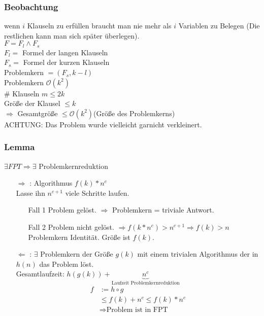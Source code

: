 \begin{enumerate}
\subsubsection*{Beobachtung}
wenn $i$ Klauseln zu erfüllen braucht man nie mehr als $i$ Variablen zu Belegen (Die restlichen kann man sich später überlegen).\\
$F = F_l \land F_s$\\
$F_l = $ Formel der langen Klauseln\\
$F_s = $ Formel der kurzen Klauseln\\ 
Problemkern $= (F_s, k-l)$\\
Problemkern $\mathcal{O}(k^2)$\\
$\#$ Klauseln $m \leq 2k$\\
Größe der Klausel $\leq k$\\
$\Rightarrow$ Gesamtgröße $\leq \mathcal{O}(k^2)$(Größe des Problemkerns)\\
ACHTUNG: Das Problem wurde vielleicht garnicht verkleinert.\\
\end{enumerate}
\subsubsection{Lemma}
$\exists FPT \Rightarrow \exists$ Problemkernreduktion\\
\begin{enumerate}
\item[$\Rightarrow$]: Algorithmus $f(k)*n^c$\\
Lasse ihn $n^{c+1}$ viele Schritte laufen.\\
\begin{enumerate}
\item[Fall 1] Problem gelöst. $\Rightarrow$ Problemkern = triviale Antwort.
\item[Fall 2] Problem nicht gelöst. $\Rightarrow f(k*n^c) > n^{c+1} \Rightarrow f(k) > n$ Problemkern Identität. Größe ist $f(k)$.
\end{enumerate}
\item[$\Leftarrow$]: $\exists$ Problemkern der Größe $g(k)$ mit einem trivialen Algorithmus der in $h(n)$ das Problem löst.\\
Gesamtlaufzeit: $h(g(k))+\underbrace{n^c}_{\text{Laufzeit Problemkernreduktion}}$
\begin{align*}
f &:= h \circ g\\
& \leq f(k) + n^c \leq f(k)*n^c\\
&\Rightarrow \text{Problem ist in FPT}
\end{align*}
\end{enumerate}